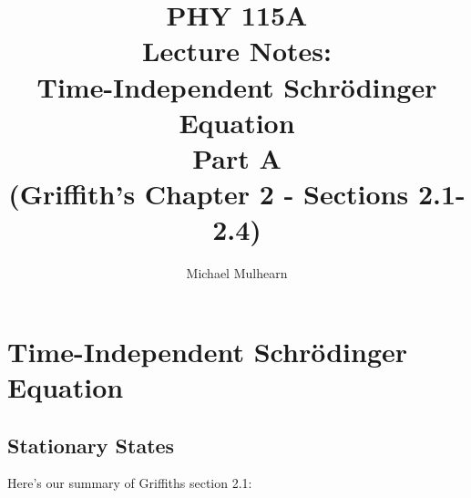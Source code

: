 \documentclass[12pt]{book}
\begin{document}
\newcommand{\ihbar}{\ensuremath{i \hbar}}
\newcommand{\Pss}{\ensuremath{\Psi^*}}
\newcommand{\dPsidt}{\ensuremath{ \frac{\partial \Psi}{\partial t} }}
\newcommand{\dPsidx}{\ensuremath{ \frac{\partial \Psi}{\partial x} }}
\newcommand{\ddPsidx}{\ensuremath{ \frac{\partial^2 \Psi}{\partial x^2} }}
\newcommand{\dPssdt}{\ensuremath{ \frac{\partial \Psi^*}{\partial t} }}
\newcommand{\dPssdx}{\ensuremath{ \frac{\partial \Psi^*}{\partial x} }}
\newcommand{\ddPssdx}{\ensuremath{ \frac{\partial^2 \Psi^*}{\partial x^2} }}

\newcommand{\dphidt}{\ensuremath{ \frac{d \phi}{dt} }}
\newcommand{\dpsidx}{\ensuremath{ \frac{d \psi}{dx} }}
\newcommand{\ddpsidx}{\ensuremath{ \frac{d^2 \psi}{dx^2} }}


\title{PHY 115A \\ Lecture Notes: \\ 
Time-Independent Schr\"odinger Equation \\
Part A \\
(Griffith's Chapter 2 - Sections 2.1-2.4)}
\author{Michael Mulhearn}

\maketitle

\setcounter{chapter}{1}
\chapter{Time-Independent Schr\"odinger Equation}

\section{Stationary States}

Here's our summary of Griffiths section 2.1:
\end{document}
